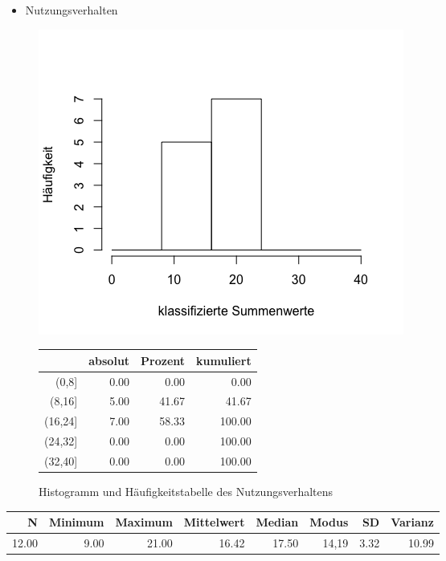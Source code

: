 \documentclass[12pt, bibliography=totoc]{scrartcl}
\begin{document}
\begin{itemize}
\tightlist
\item
  Nutzungsverhalten
\end{itemize}

\begin{figure}[H]
\begin{minipage}{.5\linewidth}
\includegraphics[width=1.0\linewidth]{Anhang/NVHistn.png}

\label{pic:aufbau}
\end{minipage}
\begin{minipage}{.5\linewidth}
\centering
\raisebox{\depth}
{\begin{tabular}{rrrr}
  \hline
 & absolut & Prozent & kumuliert \\ 
  \hline
(0,8] & 0.00 & 0.00 & 0.00 \\ 
  (8,16] & 5.00 & 41.67 & 41.67 \\ 
  (16,24] & 7.00 & 58.33 & 100.00 \\ 
  (24,32] & 0.00 & 0.00 & 100.00 \\ 
  (32,40] & 0.00 & 0.00 & 100.00 \\ 
   \hline
\end{tabular}

}
\label{tab:defis}
\end{minipage}
\caption{Histogramm und Häufigkeitstabelle des Nutzungsverhaltens}
\end{figure}

\begin{table}[H]
\centering
\begin{tabular}{rrrrrrrr}
  \hline
  N & Minimum & Maximum & Mittelwert & Median & Modus & SD & Varianz \\
  \hline
 12.00 & 9.00 & 21.00 & 16.42 & 17.50 & 14,19 & 3.32 & 10.99 \\     
   \hline
\end{tabular}
\end{table}
\end{document}
